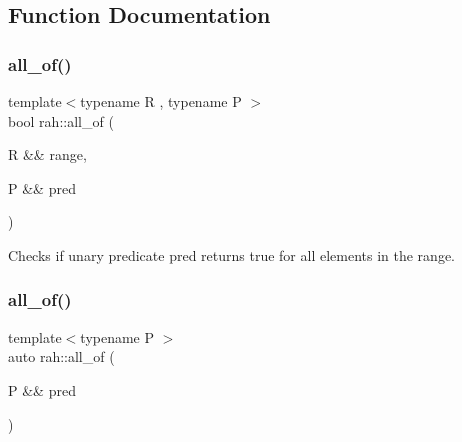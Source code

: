 \subsection{Function Documentation}
\mbox{\label{namespacerah_aaf7abb6066c8adfe6959691c3a3ea4e2}} 
\subsubsection{\texorpdfstring{all\_of()}{all\_of()}\hspace{0.1cm}{\footnotesize\ttfamily [1/2]}}
{\footnotesize\ttfamily template$<$typename R , typename P $>$ \\
bool rah\+::all\+\_\+of (\begin{DoxyParamCaption}\item[{R \&\&}]{range,  }\item[{P \&\&}]{pred }\end{DoxyParamCaption})}



Checks if unary predicate pred returns true for all elements in the range. 


\begin{DoxyCodeInclude}{0}
\DoxyCodeLine{    );}
\end{DoxyCodeInclude}
\mbox{\label{namespacerah_a4066165c960917a330beeed75a0f96e7}} 
\subsubsection{\texorpdfstring{all\_of()}{all\_of()}\hspace{0.1cm}{\footnotesize\ttfamily [2/2]}}
{\footnotesize\ttfamily template$<$typename P $>$ \\
auto rah\+::all\+\_\+of (\begin{DoxyParamCaption}\item[{P \&\&}]{pred }\end{DoxyParamCaption})}



